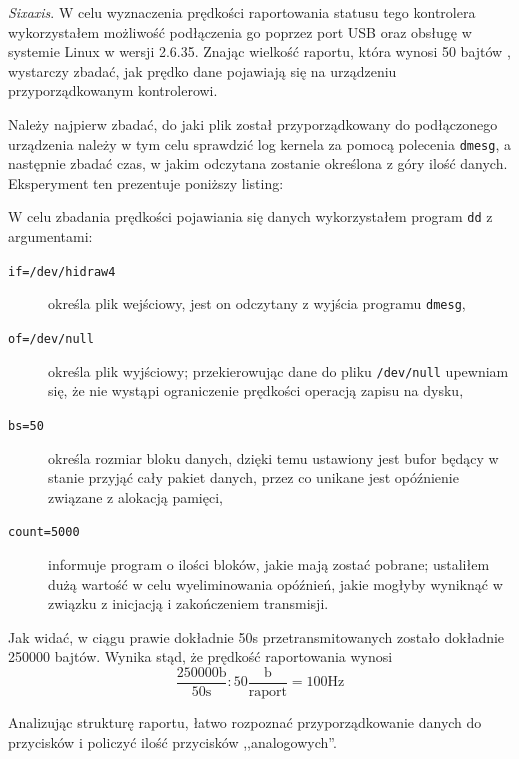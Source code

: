 \textsl{Sixaxis}. W celu wyznaczenia prędkości raportowania statusu tego kontrolera wykorzystałem możliwość podłączenia go poprzez port USB oraz obsługę w systemie Linux w wersji 2.6.35. Znając wielkość raportu, która wynosi 50 bajtów \citep{Br10}, wystarczy zbadać, jak prędko dane pojawiają się na urządzeniu przyporządkowanym kontrolerowi. 

Należy najpierw zbadać, do jaki plik został przyporządkowany do podłączonego urządzenia \ppauza należy w tym celu sprawdzić log kernela za pomocą polecenia \texttt{dmesg}, a następnie zbadać czas, w jakim odczytana zostanie określona z góry ilość danych. Eksperyment ten prezentuje poniższy listing:



W celu zbadania prędkości pojawiania się danych wykorzystałem program \texttt{dd} z argumentami:
\begin{description}
 \item[\texttt{if=/dev/hidraw4}] określa plik wejściowy, jest on odczytany z wyjścia programu \texttt{dmesg},
 \item[\texttt{of=/dev/null}] określa plik wyjściowy; przekierowując dane do pliku \texttt{/dev/null} upewniam się, że nie wystąpi ograniczenie prędkości operacją zapisu na dysku,
 \item[\texttt{bs=50}] określa rozmiar bloku danych, dzięki temu ustawiony jest bufor będący w stanie przyjąć cały pakiet danych, przez co unikane jest opóźnienie związane z alokacją pamięci,
 \item[\texttt{count=5000}] informuje program o ilości bloków, jakie mają zostać pobrane; ustaliłem dużą wartość w celu wyeliminowania opóźnień, jakie mogłyby wyniknąć w związku z inicjacją i zakończeniem transmisji.
\end{description}

Jak widać, w ciągu prawie dokładnie 50s przetransmitowanych zostało dokładnie 250000 bajtów. Wynika stąd, że prędkość raportowania wynosi
\begin{equation}
 \frac{250000\textrm{b}}{50\textrm{s}} : 50\frac{\textrm{b}}{\textrm{raport}} = 100\textrm{Hz}
\end{equation}

Analizując strukturę raportu, łatwo rozpoznać przyporządkowanie danych do przycisków i policzyć ilość przycisków ,,analogowych''.
\newline

